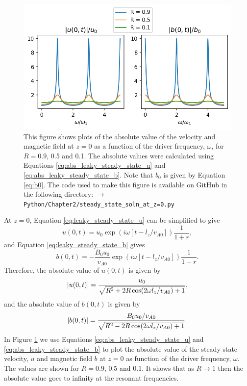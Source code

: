 \begin{figure}
    \centering
    \vspace{-20pt}
    \includegraphics[width=\textwidth,height=0.9\textheight,keepaspectratio]{figures/chapter02/steady_state_soln_at_z=0.png}
    \vspace{-30pt}
    \caption{This figure shows plots of the absolute value of the velocity and magnetic field at $z=0$ as a function of the driver frequency, $\omega$, for $R=0.9$, 0.5 and 0.1. The absolute values were calculated using Equations \eqref{eq:abs_leaky_steady_state_u} and \eqref{eq:abs_leaky_steady_state_b}. Note that $b_0$ is given by Equation \eqref{eq:b0}. The code used to make this figure is available on GitHub in the following directory:\newline
    \texttt{$\rightarrow$ Python/Chapter2/steady\_state\_soln\_at\_z=0.py}}
    \label{fig:steady_state_soln_at_z=0}
\end{figure}

At $z=0$, Equation \eqref{eq:leaky_steady_state_u} can be simplified to give
\begin{equation}
    \label{eq:leaky_steady_state_u_z=0}
    u(0,t) = u_0\exp(i\omega[t - l_z/v_{A0}])\frac{1}{1+r},
\end{equation}
and Equation \eqref{eq:leaky_steady_state_b} gives
\begin{equation}
    \label{eq:leaky_steady_state_b_z=0}
    b(0,t) = -\frac{B_0u_0}{v_{A0}}\exp(i\omega[t - l_z/v_{A0}])\frac{1}{1-r}.
\end{equation}
Therefore, the absolute value of $u(0,t)$ is given by
\begin{equation}
    \label{eq:abs_leaky_steady_state_u}
    \abs{u(0,t)} = \frac{u_0}{\sqrt{R^2+2R\cos(2\omega l_z / v_{A0})+1}},
\end{equation}
and the absolute value of $b(0,t)$ is given by
\begin{equation}
    \label{eq:abs_leaky_steady_state_b}
    \abs{b(0,t)} = \frac{B_0 u_0 / v_{A0}}{\sqrt{R^2-2R\cos(2\omega l_z / v_{A0})+1}}.
\end{equation}
In Figure \ref{fig:steady_state_soln_at_z=0} we use Equations \eqref{eq:abs_leaky_steady_state_u} and \eqref{eq:abs_leaky_steady_state_b} to plot the absolute value of the steady state  velocity, $u$ and magnetic field $b$ at $z=0$ as function of the driver frequency, $\omega$. The values are shown for $R=0.9$, 0.5 and 0.1. It shows that as $R\rightarrow 1$ then the absolute value goes to infinity at the resonant frequencies.

